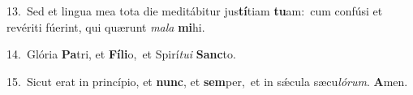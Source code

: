 {\numbfont\textcolor{\numbcolor}{13.}}~Sed et lingua mea tota die meditábitur jus\-\textbf{tí}\-tiam \textbf{tu}\-am:~\star cum confúsi et revériti fúerint, qui quærunt \textit{ma}\-\textit{la} \textbf{mi}\-hi.\par
{\numbfont\textcolor{\numbcolor}{14.}}~Glória \textbf{Pa}\-tri, et \textbf{Fí}\-\textbf{li}o,~\star et Spirí\-\textit{tu}\-\textit{i} \textbf{Sanc}\-to.\par
{\numbfont\textcolor{\numbcolor}{15.}}~Sicut erat in princípio, et \textbf{nunc}\-, et \textbf{sem}\-per,~\star et in sǽcula sæcu\-\textit{ló}\-\textit{rum}. \textbf{A}\-men.\par
